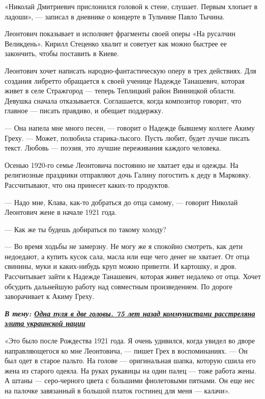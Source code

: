 «Николай Дмитриевич прислонился головой к стене, слушает. Первым хлопает в ладоши», — записал в дневнике о концерте в Тульчине Павло Тычина.

Леонтович показывает и исполняет фрагменты своей оперы «На русалчин Великдень».
Кирилл Стеценко хвалит и советует как можно быстрее ее закончить, чтобы
поставить в Киеве.

Леонтович хочет написать народно-фантастическую оперу в трех действиях. Для
создания либретто обращается к своей ученице Надежде Танашевич, которая живет в
селе Стражгород — теперь Теплицкий район Винницкой области. Девушка сначала
отказывается. Соглашается, когда композитор говорит, что главное — писать
правдиво, и обещает поддержку.

— Она напела мне много песен, — говорит о Надежде бывшему коллеге Акиму Греху.
— Может, полюбила старика-лысого. Пусть любит, будет лучше писать текст. Любовь
— поэзия, это лучшие переживания каждого человека.

Осенью 1920-го семье Леонтовича постоянно не хватает еды и одежды. На
религиозные праздники отправляют дочь Галину погостить к деду в Марковку.
Рассчитывают, что она принесет каких-то продуктов.

— Надо мне, Клава, как-то добраться до отца самому, — говорит Николай Леонтович
жене в начале 1921 года.

— Как же ты будешь добираться по такому холоду?

— Во время ходьбы не замерзну. Не могу же я спокойно смотреть, как дети
недоедают, а купить кусок сала, масла или еще чего денег не хватает. От отца
свинины, муки и каких-нибудь круп можно привезти. И картошку, и дров.
Рассчитывает зайти к Надежде Танашевич, которая живет недалеко от отца. Хочет
обсудить дальнейшую работу над совместным произведением. По дороге заворачивает
к Акиму Греху.

\begin{leftbar}
  \begingroup
    \em\Large\bfseries\color{blue}
				В тему: \href{http://argumentua.com/stati/odna-pulya-v-dve-golovy-75-let-nazad-kommunistami-rasstrelyana-elita-ukrainskoi-natsii}{Одна пуля в две головы. 75 лет назад коммунистами расстреляна элита украинской нации}
  \endgroup
\end{leftbar}

«Это было после Рождества 1921 года. Я очень удивился, когда увидел во дворе
направляющегося ко мне Леонтовича, — пишет Грех в воспоминаниях. — Он был одет
в старое пальто. На голове — оригинальная шапка, которую сшила его жена из
старого одеяла. На руках рукавицы на один палец — тоже работа жены. А штаны —
серо-черного цвета с большими фиолетовыми пятнами. Он еще нес на палочке
завязанный в большой платок гостинец для меня — калачи».

